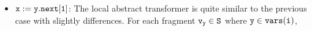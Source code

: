 \begin{itemize}
	
\item ${\tt x := y.next[1]}$: The local abstract transformer is quite similar to the previous case with slightly differences. For each fragment $\tt \mathtt{v}_y \in S$ where $\tt y \in {\tt vars}(\tt i)$,
%
%
%
%
%
%
%

\end{itemize}
